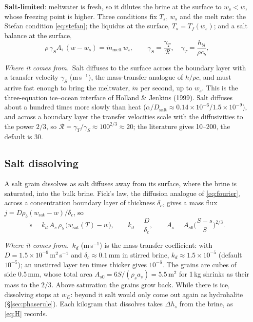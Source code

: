 \documentclass[11pt,a4paper]{article}
\newcommand{\where}{\par\noindent\textit{Where it comes from.}\ }
\begin{document}
\textbf{Salt-limited}: meltwater is fresh, so it dilutes the brine at the surface to $w_s < w$, whose
freezing point is higher. Three conditions fix $T_s$, $w_s$ and the melt rate: the Stefan condition
\eqref{eq:stefan}; the liquidus at the surface, $T_s = T_f(w_s)$; and a salt balance at the surface,
\begin{equation}
\rho\,\gamma_S A_i\,(w - w_s) = \dot m_{\text{melt}}\,w_s,
\qquad \gamma_S = \frac{\gamma_T}{\mathcal R},\quad \gamma_T = \frac{h_{bi}}{\rho c_b},
\label{eq:salt3}
\end{equation}
\where Salt diffuses to the surface across the boundary layer with a transfer velocity $\gamma_S$
(m\,s$^{-1}$), the mass-transfer analogue of $h/\rho c$, and must arrive fast enough to bring the
meltwater, $\dot m$ per second, up to $w_s$. This is the three-equation ice–ocean interface of Holland \&
Jenkins (1999). Salt diffuses about a hundred times more slowly than heat ($\alpha/D_{\text{salt}} \approx
0.14\times10^{-6}/1.5\times10^{-9}$), and across a boundary layer the transfer velocities scale with
the diffusivities to the power $2/3$, so $\mathcal R = \gamma_T/\gamma_S \approx 100^{2/3} \approx 20$;
the literature gives 10–200, the default is 30.

\subsection{Salt dissolving}
\label{sec:dissolve}
A salt grain dissolves as salt diffuses away from its surface, where the brine is saturated, into the
bulk brine. Fick's law, the diffusion analogue of \eqref{eq:fourier}, across a concentration
boundary layer of thickness $\delta_c$, gives a mass flux
$j = D\rho_b(w_{\text{sat}} - w)/\delta_c$, so
\begin{equation}
\dot s = k_d\,A_s\,\rho_b\,\big(w_{\text{sat}}(T) - w\big),\qquad k_d = \frac{D}{\delta_c},
\qquad A_s = A_{s0}\Big(\frac{S - s}{S}\Big)^{2/3}.
\label{eq:dissolve}
\end{equation}
\where $k_d$ (m\,s$^{-1}$) is the mass-transfer coefficient: with $D = 1.5\times10^{-9}$\,m$^2$\,s$^{-1}$
and $\delta_c \approx 0.1$\,mm in stirred brine, $k_d \approx 1.5\times10^{-5}$ (default $10^{-5}$); an
unstirred layer ten times thicker gives $10^{-6}$. The grains are cubes of side 0.5\,mm, whose total
area $A_{s0} = 6S/(\rho_s a_s) = 5.5$\,m$^2$ for 1\,kg shrinks as their mass to the $2/3$. Above
saturation the grains grow back. While there is ice, dissolving stops at $w_E$: beyond it salt would
only come out again as hydrohalite (§\ref{sec:phaserule}). Each kilogram that dissolves takes
$\Delta h_s$ from the brine, as \eqref{eq:H} records.
\end{document}
